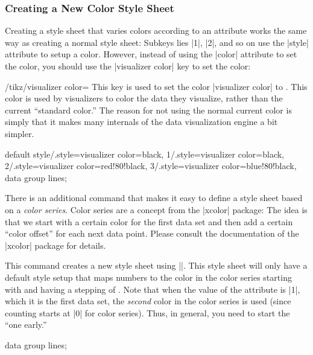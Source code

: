 \subsubsection{Creating a New Color Style Sheet}

Creating a style sheet that varies colors according to an attribute
works the same way as creating a normal style sheet: Subkeys lies |1|,
|2|, and so on use the |style| attribute to setup a color. However,
instead of using the |color| attribute to set the color, you should
use the |visualizer color| key to set the color:

\begin{key}{/tikz/visualizer color=}
  This key is used to set the color |visualizer color| to
  . This color is used by visualizers to color the data
  they visualize, rather than the current ``standard color.'' The
  reason for not using the normal current color is simply that it
  makes many internals of the data visualization engine a bit
  simpler. 
\begin{codeexample}[]
{
  default style/.style={visualizer color=black},
  1/.style={visualizer color=black},
  2/.style={visualizer color=red!80!black},
  3/.style={visualizer color=blue!80!black},
}
\tikz \datavisualization [
  school book axes,
  visualize as line=normal,
  visualize as line=heated,
  visualize as line=critical,
  style sheet=my colors]
data group {lines};
\end{codeexample}
\end{key}

There is an additional command that makes it easy to define a style
sheet based on a \emph{color series}. Color series are a concept from
the |xcolor| package: The idea is that we start with a certain color
for the first data set and then add a certain ``color offset'' for
each next data point. Please consult the documentation of the |xcolor|
package for details.

\begin{command}{\tikzdvdeclarestylesheetcolorseries{}}
  This command creates a new style sheet using
  |\pgfdvdeclarestylesheet|. This style sheet will only have a default
  style setup that maps numbers to the color in the color series
  starting with  and having a stepping of
  . Note that when the value of the attribute is |1|, which
  it is the first data set, the \emph{second} color in the color
  series is used (since counting starts at |0| for color
  series). Thus, in general, you need to start the  ``one early.''
\begin{codeexample}[]
\tikz \datavisualization [
  school book axes,
  visualize as line=normal,
  visualize as line=heated,
  visualize as line=critical,
  style sheet=greens]
data group {lines};
\end{codeexample}

\end{command}




